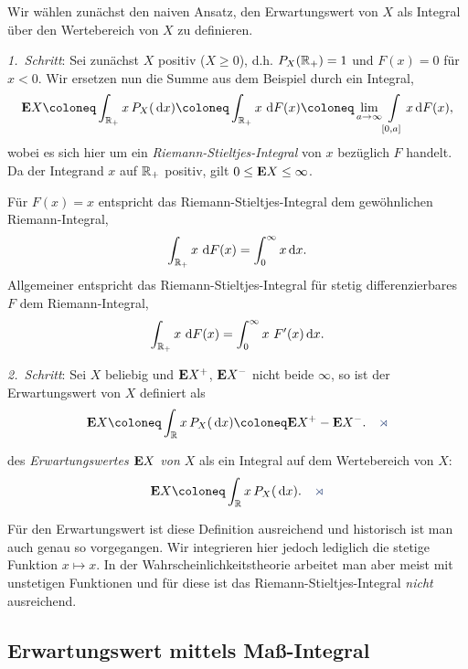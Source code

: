 Wir wählen zunächst den naiven Ansatz, den Erwartungswert von $X$ als Integral
über den Wertebereich von $X$ zu definieren.

\textit{1.\ Schritt}: Sei zunächst $X$ positiv ($X\geq 0$), d.h. $P_{X}(\mathbb{R}_{+})=
1$ und $F(x) =0$ für $x < 0$. Wir ersetzen nun die Summe aus dem Beispiel durch
ein Integral,
\begin{align*}
\E X\defl 
\int_{\R_{+}} x\,P_{X}(\dx)
\defl
\int_{\R_{+}}x\,\dF(x) \defl
\lim\limits_{a \to \infty}
\int\limits_{[0,a]} x\dF(x),
\end{align*}
wobei es sich hier um ein \textit{Riemann-Stieltjes-Integral} von $x$ bezüglich
$F$ handelt. Da der Integrand $x$ auf $\mathbb{R}_+$ positiv, gilt $0 \leq \textbf{E} X \leq \infty$.

Für $F(x) = x$ entspricht das Riemann-Stieltjes-Integral dem gewöhnlichen
Riemann-Integral,
\begin{align*}
\int_{\mathbb{R}_{+}}x\,\,\mathrm{d} F(x) = \int_0^\infty x \,\mathrm{d} x.
\end{align*}
Allgemeiner entspricht das Riemann-Stieltjes-Integral 
für stetig differenzierbares $F$ dem
Riemann-Integral,
\begin{align*}
\int_{\mathbb{R}_{+}}x\,\,\mathrm{d} F(x) = \int_0^\infty x\ F'(x)\,\mathrm{d} x.
\end{align*}

\textit{2.\ Schritt}: Sei $X$ beliebig und $\textbf{E} X^{+}$, $\textbf{E} X^{-}$ nicht beide
$\infty$, so ist der Erwartungswert von $X$ definiert als
\begin{align*}
\E X\defl \int_{\R}x\, P_{X}(\dx) \defl \E X^{+} - \E X^{-}.\fishhere
\end{align*}

\begin{defn}
\label{defn:4.1}
des \emph{Erwartungswertes $\textbf{E} X$ von $X$} als ein
Integral auf dem Wertebereich von $X$:
\begin{align*}
\E X \defl \int_{\R} x\, P_{X}(\dx).\fishhere
\end{align*}
\end{defn}

Für den Erwartungswert ist diese Definition ausreichend und historisch ist man
auch genau so vorgegangen. Wir integrieren hier jedoch lediglich die stetige
Funktion $x\mapsto x$. In der Wahrscheinlichkeitstheorie arbeitet man aber
meist mit unstetigen Funktionen und für diese ist das
Riemann-Stieltjes-Integral \textit{nicht} ausreichend.

\subsection{Erwartungswert mittels Maß-Integral}

